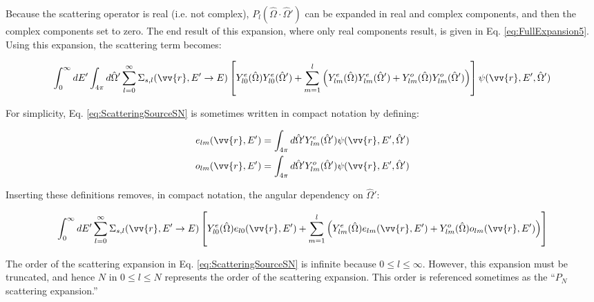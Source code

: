 \documentclass[10pt]{article}
\newcommand{\hO}{\hat{\Omega}}
\begin{document}
\begin{flushleft}
Because the scattering operator is real (i.e. not complex), \(P_l(\hO  \cdot\hO  ')\) can be expanded in real and complex components, and then the complex components set to zero. The end result of this expansion, where only real components result, is given in Eq. \eqref{eq:FullExpansion5}. Using this expansion, the scattering term becomes:

\begin{equation}
\label{eq:ScatteringSourceSN}
\begin{aligned}
\int_{0}^{\infty}dE' \int_{4\pi}^{ } d\hO  ' \sum_{l=0}^{\infty}\Sigma_{s,l}(\vv{r}, E'\rightarrow E)\left\lbrack Y_{l0}^e(\hO  )Y_{l0}^e(\hO  ')+\sum_{m=1}^{l}\left(Y_{lm}^e(\hO  )Y_{lm}^{e}(\hO  ')+Y_{lm}^o(\hO  )Y_{lm}^{o}(\hO  ')\right)\right\rbrack\psi(\vv{r}, E', \hO  ')\\
\end{aligned}
\end{equation}

\begin{tcolorbox}[breakable]
For simplicity, Eq. \eqref{eq:ScatteringSourceSN} is sometimes written in compact notation by defining:

\begin{equation}
\label{eq:FluxMoments31}
\begin{aligned}
e_{lm}(\vv{r},E')=\int_{4\pi}^{}d\hO  'Y_{lm}^e(\hO  ')\psi(\vv{r}, E',\hO  ')\\
o_{lm}(\vv{r},E')=\int_{4\pi}^{}d\hO  'Y_{lm}^o(\hO  ')\psi(\vv{r}, E',\hO  ')\\
\end{aligned}
\end{equation}

Inserting these definitions removes, in compact notation, the angular dependency on \(\hO  '\):

\begin{equation}
\label{eq:ScatteringSourceSNSimple}
\begin{aligned}
\int_{0}^{\infty}dE' \sum_{l=0}^{\infty}\Sigma_{s,l}(\vv{r}, E'\rightarrow E)\left\lbrack Y_{l0}^e(\hO  )e_{l0}(\vv{r},E')+\sum_{m=1}^{l}\left(Y_{lm}^e(\hO  )e_{lm}(\vv{r},E')+Y_{lm}^o(\hO  )o_{lm}(\vv{r},E')\right)\right\rbrack\\
\end{aligned}
\end{equation}
\end{tcolorbox}

The order of the scattering expansion in Eq. \eqref{eq:ScatteringSourceSN} is infinite because \(0\leq l\leq\infty\). However, this expansion must be truncated, and hence \(N\) in \(0\leq l\leq N\) represents the order of the scattering expansion. This order is referenced sometimes as the ``\(P_N\) scattering expansion.'' 


\end{flushleft}
\end{document}
